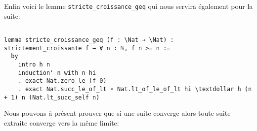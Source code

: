 \documentclass[a4paper, 12pt]{article}
\newcommand{\lean}[1]{\texttt{#1}}
\begin{document}
\vspace{\baselineskip} 

Enfin voici le lemme \lean{stricte_croissance_geq} qui nous servira également pour la suite:

\begin{verbatim}

lemma stricte_croissance_geq (f : \Nat → \Nat) : strictement_croissante f → ∀ n : ℕ, f n >= n :=
  by
    intro h n
    induction' n with n hi
    . exact Nat.zero_le (f 0)
    . exact Nat.succ_le_of_lt ∘ Nat.lt_of_le_of_lt hi \textdollar h (n + 1) n (Nat.lt_succ_self n)
\end{verbatim}   
    

Nous pouvons à présent prouver que si une suite converge alors toute suite extraite converge vers la même limite:    
\end{document}
